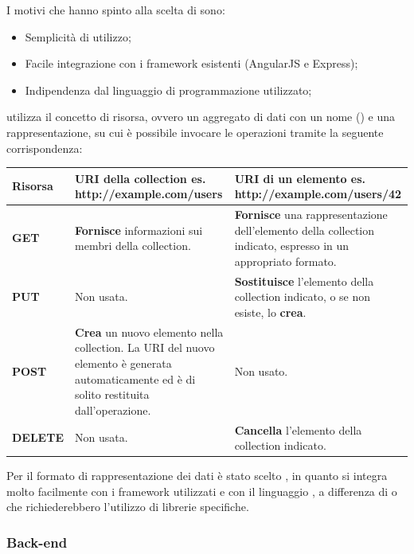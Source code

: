 I motivi che hanno spinto alla scelta di  sono:
\begin{itemize}
	\item Semplicità di utilizzo;
	\item Facile integrazione con i framework esistenti (AngularJS e Express);
	\item Indipendenza dal linguaggio di programmazione utilizzato;
\end{itemize}

 utilizza il concetto di risorsa, ovvero un aggregato di dati con un nome () e una rappresentazione, su cui è possibile invocare le operazioni  tramite la seguente corrispondenza:

\begin{tabularx}{\textwidth}{|P{2.5cm}|X|X|}
\hline
	\textbf{Risorsa} & \textbf{URI della collection} \newline es. http://example.com/users & \textbf{URI di un elemento} \newline es. http://example.com/users/42 \\
\hline
	\textbf{GET} & \textbf{Fornisce} informazioni sui membri della collection. & \textbf{Fornisce} una rappresentazione dell'elemento della collection indicato, espresso in un appropriato formato. \\
\hline
	\textbf{PUT} & Non usata. & \textbf{Sostituisce} l'elemento della collection indicato, o se non esiste, lo \textbf{crea}. \\
\hline
	\textbf{POST} & \textbf{Crea} un nuovo elemento nella collection. La URI del nuovo elemento è generata automaticamente ed è di solito restituita dall'operazione. & Non usato. \\
\hline
	\textbf{DELETE} & Non usata. & \textbf{Cancella} l'elemento della collection indicato. \\
\hline
\end{tabularx}

Per il formato di rappresentazione dei dati è stato scelto , in quanto si integra molto facilmente con i framework utilizzati e con il linguaggio , a differenza di  o  che richiederebbero l'utilizzo di librerie specifiche.


\subsubsection{Back-end}

